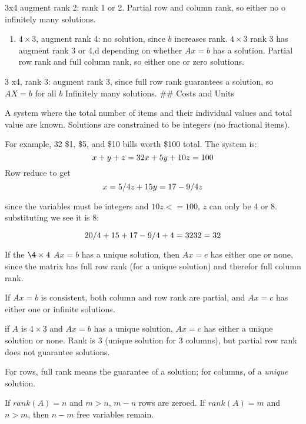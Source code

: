 \documentclass[]{article}
\providecommand{\tightlist}{%
  \setlength{\itemsep}{0pt}\setlength{\parskip}{0pt}}
\begin{document}
3x4 augment rank 2: rank 1 or 2. Partial row and column rank, so either
no o infinitely many solutions.

\begin{enumerate}
\def\labelenumi{\alph{enumi}.}
\setcounter{enumi}{2}
\tightlist
\item
  \(4\times{3}\), augment rank 4: no solution, since \(b\) increases
  rank. \(4\times{3}\) rank 3 has augment rank 3 or 4,d depending on
  whether \(Ax=b\) has a solution. Partial row rank and full column
  rank, so either one or zero solutions.
\end{enumerate}

3 x4, rank 3: augment rank 3, since full row rank guarantees a solution,
so \(AX=b\) for all \(b\) Infinitely many solutions. \#\# Costs and
Units

A system where the total number of items and their individual values and
total value are known. Solutions are constrained to be integers (no
fractional items).

For example, 32 \$1, \$5, and \$10 bills worth \$100 total. The system
is: \[x+y+z=32\\
x+5y+10z=100\] Row reduce to get \[x = 5/4z+15\\
y=17-9/4z\]

since the variables must be integers and \(10z<=100\), \(z\) can only be
4 or 8. substituting we see it is 8:

\[20/4+15+17-9/4+4=32\\
32=32\]

If the \(\4\times{4}\) \(Ax=b\) has a unique solution, then \(Ax=c\) has
either one or none, since the matrix has full row rank (for a unique
solution) and therefor full column rank.

If \(Ax=b\) is consistent, both column and row rank are partial, and
\(Ax=c\) has either one or infinite solutions.

if \(A\) is \(4\times{3}\) and \(Ax=b\) has a unique solution, \(Ax=c\)
has either a unique solution or none. Rank is 3 (unique solution for 3
columns), but partial row rank does not guarantee solutions.

For rows, full rank means the guarantee of a solution; for columns, of a
\emph{unique} solution.

If \(rank(A)=n\) and \(m>n\), \(m-n\) rows are zeroed. If
\(rank(A) = m\) and \(n>m\), then \(n-m\) free variables remain.
\end{document}
